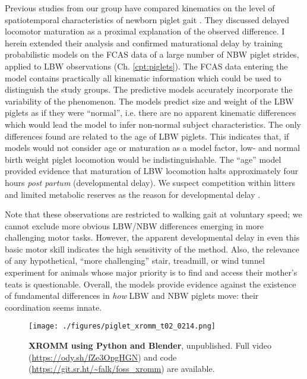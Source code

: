 Previous studies from our group have compared kinematics on the level of spatiotemporal characteristics of newborn piglet gait \citep{VandenHole2018}.
They discussed delayed locomotor maturation as a proximal explanation of the observed difference.
I herein extended their analysis and confirmed maturational delay by training probabilistic models on the FCAS data of a large number of NBW piglet strides, applied to LBW observations (Ch. \ref{cpt:piglets}).
The FCAS data entering the model contains practically all kinematic information which could be used to distinguish the study groups.
The predictive models accurately incorporate the variability of the phenomenon.
The models predict size and weight of the LBW piglets as if they were ``normal'', i.e. there are no apparent kinematic differences which would lead the model to infer non-normal subject characteristics.
The only differences found are related to the age of LBW piglets.
This indicates that, if models would not consider age or maturation as a model factor, low- and normal birth weight piglet locomotion would be indistinguishable.
The ``age'' model provided evidence that maturation of LBW locomotion halts approximately four hours \emph{post partum} (developmental delay).
We suspect competition within litters and limited metabolic reserves as the reason for developmental delay \citep{VandenHole2019}.

Note that these observations are restricted to walking gait at voluntary speed; we cannot exclude more obvious LBW/NBW differences emerging in more challenging motor tasks.
However, the apparent developmental delay in even this basic motor skill indicates the high sensitivity of the method.
Also, the relevance of any hypothetical, ``more challenging'' stair, treadmill, or wind tunnel experiment for animals whose major priority is to find and access their mother's teats is questionable.
Overall, the models provide  evidence against the existence of fundamental differences in \emph{how} LBW and NBW piglets move: their coordination seems innate.



\begin{figure}[p]
\centering
\texttt{[image: ./figures/piglet\_xromm\_t02\_0214.png]}
\caption{\label{fig:piglet_xromm}\textbf{XROMM using Python and Blender}, unpublished. Full video (\url{https://ody.sh/fZe3OpgHGN}) and code (\url{https://git.sr.ht/\~falk/foss\_xromm}) are available.}
\end{figure}

